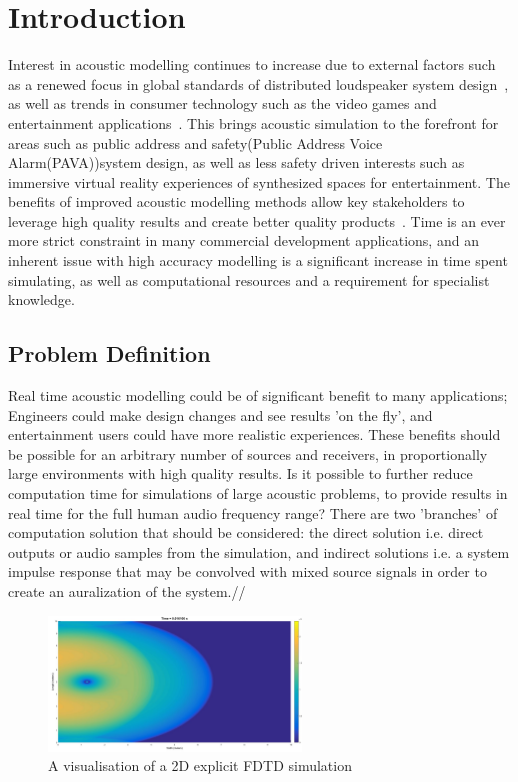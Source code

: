 \documentclass{svproc}
\begin{document}
\section{Introduction}
Interest in acoustic modelling continues to increase due to external factors such as a renewed focus in global standards of distributed loudspeaker system design~\cite{BritishStandardsInst2013}, as well as trends in consumer technology such as the video games and entertainment applications~\cite{Google2016}. This brings acoustic simulation to the forefront for areas such as public address and safety(Public Address Voice Alarm(PAVA))system design, as well as less safety driven interests such as immersive virtual reality experiences of synthesized spaces for entertainment. The benefits of improved acoustic modelling methods allow key stakeholders to leverage high quality results and create better quality products~\cite{Dod2016}. Time is an ever more strict constraint in many commercial development applications, and an inherent issue with high accuracy modelling is a significant increase in time spent simulating, as well as computational resources and a requirement for specialist knowledge.\\

\subsection{Problem Definition}
Real time acoustic modelling could be of significant benefit to many applications; Engineers could make design changes and see results 'on the fly', and entertainment users could have more realistic experiences. These benefits should be possible for an arbitrary number of sources and receivers, in proportionally large environments with high quality results. Is it possible to further reduce computation time for simulations of large acoustic problems, to provide results in real time for the full human audio frequency range? There are two 'branches' of computation solution that should be considered: the direct solution i.e. direct outputs or audio samples from the simulation, and indirect solutions i.e. a system impulse response that may be convolved with mixed source signals in order to create an auralization of the system.//


\begin{figure}
\centering
\includegraphics[width=0.6\textwidth]{explicit2dfdtd.jpg}
\centering
\caption{A visualisation of a 2D explicit FDTD simulation ~\cite{Durbridge2016a}}
\end{figure}
\end{document}

